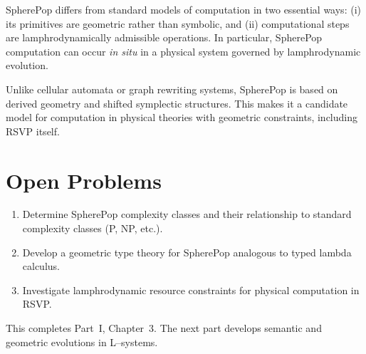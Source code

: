 SpherePop differs from standard models of computation in two essential
ways: (i) its primitives are geometric rather than symbolic, and (ii)
computational steps are lamphrodynamically admissible operations. In
particular, SpherePop computation can occur \emph{in situ} in a physical
system governed by lamphrodynamic evolution.

\begin{remark}
Unlike cellular automata or graph rewriting systems, SpherePop is based
on derived geometry and shifted symplectic structures. This makes it a
candidate model for computation in physical theories with geometric
constraints, including RSVP itself.
\end{remark}


\section{Open Problems}

\begin{enumerate}
\item Determine SpherePop complexity classes and their relationship to
standard complexity classes (P, NP, etc.).
\item Develop a geometric type theory for SpherePop analogous to typed
lambda calculus.
\item Investigate lamphrodynamic resource constraints for physical
computation in RSVP.
\end{enumerate}

\medskip
\noindent
This completes Part~I, Chapter~3. The next part develops semantic and
geometric evolutions in L--systems.
\newpage

